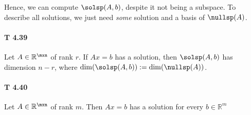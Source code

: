 Hence, we can compute $\solsp(A,b)$, despite it not being a subspace. To
describe all solutions, we just need \textit{some} solution and a basis of
$\nullsp(A)$.

\paragraph{T 4.39} Let $A\in\mathbb{R}^{\mxn}$ of rank $r$.
If $Ax=b$ has a solution, then $\solsp(A,b)$ has dimension $n-r$,
where $\dim(\solsp(A,b)):=\dim(\nullsp(A))$.

\paragraph{T 4.40} Let $A \in \mathbb{R}^{\mxn}$ of rank $m$.
Then $Ax = b$ has a solution for every $b \in \mathbb{R}^m$